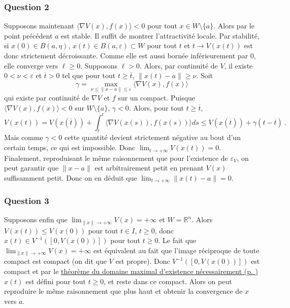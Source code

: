 \hypertarget{answer-lyap-2}{%
\subsubsection*{Question 2}\label{answer-lyap-2}}


Supposons maintenant \(\langle\nabla V (x), f(x)\rangle < 0\) pour tout
\(x\in W\setminus \{a\}\). Alors par le point précédent \(a\) est
stable. Il suffit de montrer l'attractivité locale. Par stabilité, si
\(x(0)\in B(a,\eta)\), \(x(t)\in B(a,\varepsilon)\subset W\) pour tout
\(t\) et \(t\to V(x(t))\) est donc strictement décroissante. Comme elle
est aussi bornée inférieurement par 0, elle converge vers
\(\ell \geq 0\). Supposons \(\ell>0\). Alors, par continuité de \(V\),
il existe \(0<\nu<\varepsilon\) et \(\overline{t}>0\) tel que pour tout
\(t\geq \overline{t}\), \(\|x(t)-a\| \geq \nu\). Soit \[
\gamma = \max_{\nu \leq \|x-a\| \leq \varepsilon} \langle\nabla V (x), f(x)\rangle   
\] qui existe par continuité de \(\nabla V\) et \(f\) sur un compact.
Puisque \(\langle\nabla V (x), f(x)\rangle < 0\) sur
\(W\setminus \{a\}\), \(\gamma<0\). Alors, pour tout
\(t\geq \overline{t}\), \[
V(x(t)) = V(x(\overline{t})) + \int_{\overline{t}}^t \langle\nabla V (x(s)), f(x(s))\rangle ds \leq  V(x(\overline{t})) + \gamma (t-\overline{t}) \ .
\] Mais comme \(\gamma<0\) cette quantité devient strictement négative
au bout d'un certain temps, ce qui est impossible. Donc
\(\lim_{t\to +\infty} V(x(t))=0\). Finalement, reproduisant le même
raisonnement que pour l'existence de \(\varepsilon_V\), on peut garantir
que \(\|x-a\|\) est arbitrairement petit en prenant \(V(x)\)
suffisamment petit. Donc on en déduit que
\(\lim_{t\to +\infty} \|x(t)-a\|=0\).

\hypertarget{answer-lyap-3}{%
\subsubsection*{Question 3}\label{answer-lyap-3}}


Supposons enfin que \(\lim_{\|x\|\to +\infty} V(x) = +\infty\) et
\(W=\mathbb{R}^n\). Alors \(V(x(t))\leq V(x(0))\) pour tout \(t\in I\), \(t\geq 0\), donc
\(x(t)\in V^{-1}(\left[ 0,V(x(0)) \right])\) pour tout \(t\geq 0\). Le fait
que \(\lim_{\|x\|\to +\infty} V(x) = +\infty\) est équivalent au fait
que l'image réciproque de toute compact est compact (on dit que \(V\)
est propre). Donc \(V^{-1}(\left[ 0,V(x(0)) \right])\) est compact et
par le \protect\hyperlink{theo_bouts}{théorème du domaine maximal
d'existence nécessairement (p. \pageref*{theo_bouts})} \(x(t)\) est
défini pour tout \(t\geq 0\), et reste dans ce compact. Alors on peut
reproduire le même raisonnement que plus haut et obtenir la convergence
de \(x\) vers \(a\).

